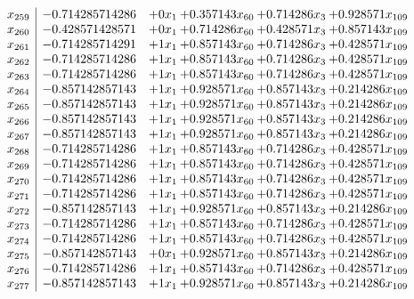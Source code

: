 \documentclass[11pt]{article}
\begin{document}
\[\begin{array}{c| c c@{\hskip 2pt} c@{\hskip 2pt} c@{\hskip 2pt} c@{\hskip 2pt} }
 x_{259}   &  -0.714285714286 & + 0 x_{1} & + 0.357143 x_{60} & + 0.714286 x_{3} & + 0.928571 x_{109}\\
 x_{260}   &  -0.428571428571 & + 0 x_{1} & + 0.714286 x_{60} & + 0.428571 x_{3} & + 0.857143 x_{109}\\
 x_{261}   &  -0.714285714291 & + 1 x_{1} & + 0.857143 x_{60} & + 0.714286 x_{3} & + 0.428571 x_{109}\\
 x_{262}   &  -0.714285714286 & + 1 x_{1} & + 0.857143 x_{60} & + 0.714286 x_{3} & + 0.428571 x_{109}\\
 x_{263}   &  -0.714285714286 & + 1 x_{1} & + 0.857143 x_{60} & + 0.714286 x_{3} & + 0.428571 x_{109}\\
 x_{264}   &  -0.857142857143 & + 1 x_{1} & + 0.928571 x_{60} & + 0.857143 x_{3} & + 0.214286 x_{109}\\
 x_{265}   &  -0.857142857143 & + 1 x_{1} & + 0.928571 x_{60} & + 0.857143 x_{3} & + 0.214286 x_{109}\\
 x_{266}   &  -0.857142857143 & + 1 x_{1} & + 0.928571 x_{60} & + 0.857143 x_{3} & + 0.214286 x_{109}\\
 x_{267}   &  -0.857142857143 & + 1 x_{1} & + 0.928571 x_{60} & + 0.857143 x_{3} & + 0.214286 x_{109}\\
 x_{268}   &  -0.714285714286 & + 1 x_{1} & + 0.857143 x_{60} & + 0.714286 x_{3} & + 0.428571 x_{109}\\
 x_{269}   &  -0.714285714286 & + 1 x_{1} & + 0.857143 x_{60} & + 0.714286 x_{3} & + 0.428571 x_{109}\\
 x_{270}   &  -0.714285714286 & + 1 x_{1} & + 0.857143 x_{60} & + 0.714286 x_{3} & + 0.428571 x_{109}\\
 x_{271}   &  -0.714285714286 & + 1 x_{1} & + 0.857143 x_{60} & + 0.714286 x_{3} & + 0.428571 x_{109}\\
 x_{272}   &  -0.857142857143 & + 1 x_{1} & + 0.928571 x_{60} & + 0.857143 x_{3} & + 0.214286 x_{109}\\
 x_{273}   &  -0.714285714286 & + 1 x_{1} & + 0.857143 x_{60} & + 0.714286 x_{3} & + 0.428571 x_{109}\\
 x_{274}   &  -0.714285714286 & + 1 x_{1} & + 0.857143 x_{60} & + 0.714286 x_{3} & + 0.428571 x_{109}\\
 x_{275}   &  -0.857142857143 & + 0 x_{1} & + 0.928571 x_{60} & + 0.857143 x_{3} & + 0.214286 x_{109}\\
 x_{276}   &  -0.714285714286 & + 1 x_{1} & + 0.857143 x_{60} & + 0.714286 x_{3} & + 0.428571 x_{109}\\
 x_{277}   &  -0.857142857143 & + 1 x_{1} & + 0.928571 x_{60} & + 0.857143 x_{3} & + 0.214286 x_{109}\\

\end{array}\]
\end{document}
